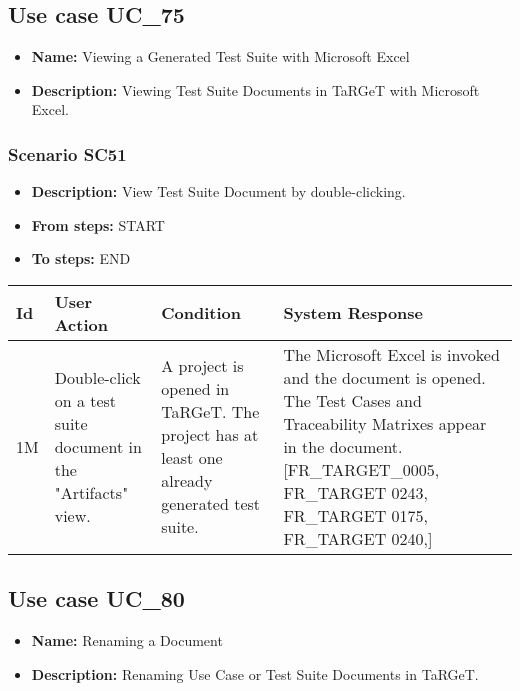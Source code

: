 \documentclass[a4paper,11pt]{article}
\newcommand{\bl}{\\ \hline}
\begin{document}
\subsection*{Use case UC_75}
\begin{itemize}
\item {\bf Name: }Viewing a Generated Test Suite with Microsoft Excel
\item {\bf Description: } Viewing Test Suite Documents in TaRGeT with Microsoft
				Excel.
\end{itemize}
\subsubsection*{Scenario SC51}
\begin{itemize}
\item {\bf Description:} View Test Suite Document by double-clicking.
				
\item {\bf From steps:} START
\item {\bf To steps:} END
\end{itemize}
\begin{tabular}{|p{0.4in}|p{1.5in}|p{1.5in}|p{1.5in}|}
\hline
Id & User Action & Condition & System Response \bl 
1M & Double-click on a test suite document in the "Artifacts"
						view. & A project is opened in TaRGeT. The project has at least
						one already generated test suite. & The Microsoft Excel is invoked and the document is
						opened. The Test Cases and Traceability Matrixes appear in the
						document.[FR_TARGET_0005, FR_TARGET 0243, FR_TARGET 0175,
						FR_TARGET 0240,]\bl
\end{tabular}
\subsection*{Use case UC_80}
\begin{itemize}
\item {\bf Name: }Renaming a Document
\item {\bf Description: }Renaming Use Case or Test Suite Documents in TaRGeT.
			
\end{itemize}
\end{document}
